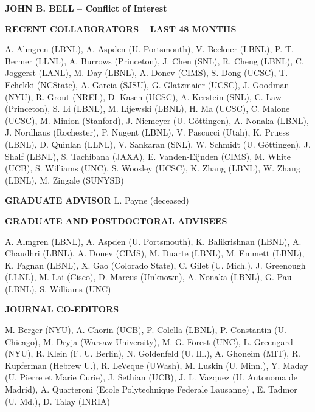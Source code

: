 \documentclass[11pt]{article}
\begin{document}
\begin{center}
{\large{\bf JOHN B. BELL -- Conflict of Interest}} \\
\end{center}

\vspace{.2 true in}
{\bf RECENT COLLABORATORS -- LAST 48 MONTHS}

\vspace{.075 true in}
A. Almgren (LBNL), A. Aspden (U. Portsmouth), V. Beckner (LBNL), P.-T. Bermer (LLNL),
A. Burrows (Princeton),
J. Chen (SNL), 
R. Cheng (LBNL), C. Joggerst (LANL), 
M. Day (LBNL), A. Donev (CIMS), S. Dong (UCSC), T. Echekki (NCState),
A. Garcia (SJSU), G. Glatzmaier (UCSC), J. Goodman (NYU), R. Grout (NREL),
D. Kasen (UCSC), A. Kerstein (SNL), C. Law (Princeton), S. Li (LBNL), M. Lijewski (LBNL),
H. Ma (UCSC), C. Malone (UCSC), M. Minion (Stanford), J. Niemeyer (U. G\"{o}ttingen), 
A. Nonaka (LBNL), J. Nordhaus (Rochester), P. Nugent (LBNL), V. Pascucci (Utah), K. Pruess (LBNL),
D. Quinlan (LLNL),
V. Sankaran (SNL), W. Schmidt (U. G\"{o}ttingen),
J. Shalf (LBNL),
S. Tachibana (JAXA), E. Vanden-Eijnden (CIMS),  M. White (UCB),
S. Williams (UNC), S. Woosley (UCSC), K. Zhang (LBNL), W. Zhang (LBNL), M. Zingale (SUNYSB)

\vspace{.2 true in}
{\bf GRADUATE ADVISOR}
L. Payne (deceased)

\vspace{.2 true in}
{\bf GRADUATE AND POSTDOCTORAL ADVISEES}

\vspace{.075 true in}
A. Almgren (LBNL), A. Aspden (U. Portsmouth), K. Balikrishnan (LBNL), A. Chaudhri (LBNL),
A. Donev (CIMS), M. Duarte (LBNL), M. Emmett (LBNL), K. Fagnan (LBNL), X. Gao (Colorado State),
C. Gilet (U. Mich.),
J. Greenough (LLNL), M. Lai (Cisco), D. Marcus (Unknown),
A. Nonaka (LBNL), G. Pau (LBNL), S. Williams (UNC)

\vspace{.2 true in}
{\bf JOURNAL CO-EDITORS}

\vspace{.075 true in}
M. Berger (NYU), A. Chorin (UCB), P. Colella (LBNL), P. Constantin (U. Chicago),
M. Dryja (Warsaw University),
M. G. Forest (UNC), L. Greengard (NYU),
R. Klein (F. U. Berlin), N. Goldenfeld (U. Ill.), A. Ghoneim (MIT), R. Kupferman (Hebrew U.), R. LeVeque (UWash),
M. Luskin (U. Minn.), Y. Maday (U. Pierre et Marie Curie), J. Sethian (UCB), J. L. Vazquez (U. Autonoma de Madrid),
A. Quarteroni (Ecole Polytechnique Federale Lausanne) , E. Tadmor (U. Md.), D. Talay (INRIA)
\end{document}
